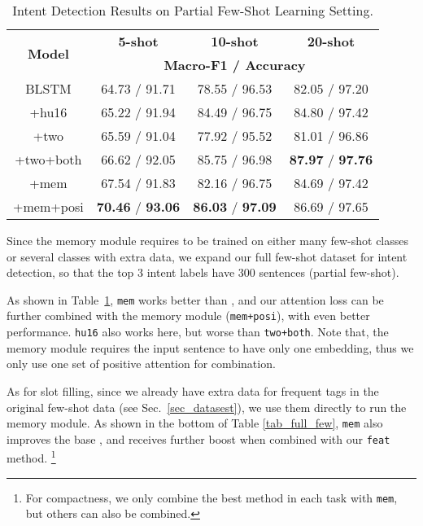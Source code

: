 \begin{table}
\setlength{\tabcolsep}{0.23em}
\centering
\small{
\begin{tabular}{|c|c|c|c|}

\hline
\multirow{2}{*}{\textbf{Model}}  & \multicolumn{1}{|c|}{\textbf{5-shot}} & \multicolumn{1}{|c|}{\textbf{10-shot}} & \multicolumn{1}{|c|}{\textbf{20-shot}}  \\
\cline{2-4}
 & \multicolumn{3}{|c|}{\textbf{Macro-F1 / Accuracy}}   \\
\hline
\rowcolor{Gray} BLSTM & 64.73 / 91.71 & 78.55 / 96.53 & 82.05 / 97.20 \\
\hline
+hu16 & 65.22 / 91.94 & 84.49 / 96.75 & 84.80 / 97.42 \\
\hline
\rowcolor{Gray} +two & 65.59 / 91.04 & 77.92 / 95.52 & 81.01 / 96.86 \\
\hline
+two+both & 66.62 / 92.05 & 85.75 / 96.98 & \textbf{87.97} / \textbf{97.76} \\
\hline
\rowcolor{Gray} +mem & 67.54 / 91.83 & 82.16 / 96.75 & 84.69 / 97.42 \\
\hline
+mem+posi & \textbf{70.46} / \textbf{93.06} & \textbf{86.03} / \textbf{97.09} & 86.69 / 97.65 \\
\hline

\end{tabular}
}
\caption{Intent Detection Results on Partial Few-Shot Learning Setting.}
\label{tab_intent_few_fill}
\end{table}

Since the memory module requires to be trained on either many few-shot classes or several classes with extra data,
we expand our full few-shot dataset for intent detection, so that the top 3 intent labels have 300 sentences (partial few-shot).

As shown in Table~\ref{tab_intent_few_fill}, \texttt{mem} works better than \BLSTM, and our attention loss can be further combined with the memory module (\texttt{mem+posi}), with even better performance. %
\texttt{hu16} also works here, but  worse than \texttt{two+both}.
Note that, the memory module requires the input sentence to have only one embedding, thus we only use one set of positive attention for combination.

As for slot filling, since we already have extra data for frequent tags in the original few-shot data (see Sec.~\ref{sec_datasest}), we use them directly to run the memory module. As shown in the bottom of Table \ref{tab_full_few}, \texttt{mem} also improves the base \BLSTM, and receives further boost when combined with our \texttt{feat} method.%
\footnote{For compactness, we only combine the best method in each task with \texttt{mem}, but others can also be combined.}

